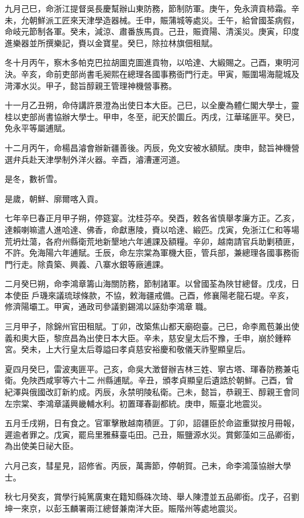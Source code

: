\begin{pinyinscope}
九月己巳，命浙江提督吳長慶幫辦山東防務，節制防軍。庚午，免永濟貢柿霜。辛未，允朝鮮派工匠來天津學造器械。壬申，賑蒲城等處災。壬午，給曾國荃病假，命岐元節制各軍。癸未，減涼、肅番族馬貢。己丑，賑資陽、清溪災。庚寅，印度進樂器並所撰樂記，賚以金寶星。癸巳，除拉林旗佃租賦。

冬十月丙午，察木多帕克巴拉胡圖克圖進貢物，以哈達、大緞賜之。己酉，東明河決。辛亥，命前吏部尚書毛昶熙在總理各國事務衙門行走。甲寅，賑圍場海龍城及渮澤水災。甲子，懿旨醇親王管理神機營事務。

十一月乙丑朔，命侍講許景澄為出使日本大臣。己巳，以全慶為體仁閣大學士，靈桂以吏部尚書協辦大學士。甲申，冬至，祀天於圜丘。丙戌，江華瑤匪平。癸巳，免永平等屬逋賦。

十二月丙午，命楊昌濬會辦新疆善後。丙辰，免文安被水額賦。庚申，懿旨神機營選弁兵赴天津學制外洋火器。辛酉，濬漕運河道。

是冬，數祈雪。

是歲，朝鮮、廓爾喀入貢。

七年辛巳春正月甲子朔，停筵宴。沈桂芬卒。癸酉，敕各省慎舉孝廉方正。乙亥，達賴喇嘛遣人進哈達、佛香，命獻惠陵，賚以哈達、緞匹。戊寅，免浙江仁和等場荒坍灶蕩，各府州縣衛荒地新墾地六年逋課及額糧。辛卯，越南請官兵助剿積匪，不許。免海陽六年逋賦。壬辰，命左宗棠為軍機大臣，管兵部，兼總理各國事務衙門行走。除貴築、興義、八寨水銀等廠逋課。

二月癸巳朔，命李鴻章籌山海關防務，節制諸軍。以曾國荃為陜甘總督。戊戌，日本使臣戶璣來議琉球條款，不協，敕海疆戒備。己酉，修襄陽老龍石堤。辛亥，修濟陽壩工。甲寅，通政司參議劉錫鴻以誣劾李鴻章職。

三月甲子，除錦州官田租賦。丁卯，改築焦山都天廟砲臺。己巳，命李鳳苞兼出使義和奧大臣，黎庶昌為出使日本大臣。辛未，慈安皇太后不豫，壬申，崩於鍾粹宮。癸未，上大行皇太后尊謚曰孝貞慈安裕慶和敬儀天祚聖顯皇后。

夏四月癸巳，雷波夷匪平。己亥，命吳大澂督辦吉林三姓、寧古塔、琿春防務兼屯衛。免陜西咸寧等六十二州縣逋賦。辛丑，頒孝貞顯皇后遺誥於朝鮮。己酉，曾紀澤與俄國改訂新約成。丙辰，永禁明陵私衛。己未，懿旨，恭親王、醇親王會同左宗棠、李鴻章議興畿輔水利。初置琿春副都統。庚申，賑臺北地震災。

五月壬戌朔，日有食之。官軍擊散越南積匪。丁卯，詔疆臣於命盜重獄按月冊報，遲逾者罪之。戊寅，罷烏里雅蘇臺屯田。己丑，賑鹽源水災。賞鄭藻如三品卿銜，為出使美日祕大臣。

六月己亥，彗星見，詔修省。丙辰，萬壽節，停朝賀。己未，命李鴻藻協辦大學士。

秋七月癸亥，賞學行純篤廣東在籍知縣硃次琦、舉人陳澧並五品卿銜。戊子，召劉坤一來京，以彭玉麟署兩江總督兼南洋大臣。賑階州等處地震災。


\end{pinyinscope}
